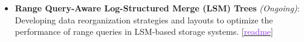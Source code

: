 \begin{itemize}\setlength\itemsep{0.4em}
	\item \textbf{Range Query-Aware Log-Structured Merge (LSM) Trees} \textit{(Ongoing)}: Developing data reorganization strategies and layouts to optimize the performance of range queries in LSM-based storage systems.
	      \href{https://github.com/shubham-sudo/LSMQueryDrivenCompaction}{[\textcolor{blueviolet}{readme}]}



\end{itemize}
